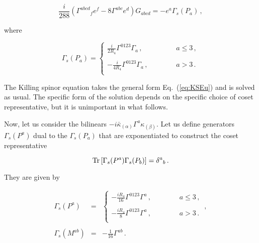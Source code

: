 \documentclass[12pt,a4paper]{article}
\begin{document}
\begin{equation}
{\textstyle\frac{i}{288}}\left(\Gamma^{abcd}{}_{f} e^{f}
-8\Gamma^{abc}e^{d} \right)G_{abcd}=
-e^{a}\Gamma_{s}(P_{a})\, ,
\end{equation}

\noindent 
where 

\begin{equation}
\Gamma_{s}(P_{a}) =
\left\{
  \begin{array}{ccc}
\frac{i}{2R_{4}}\Gamma^{0123}\Gamma_{a}\, ,& \hspace{1cm} & a\leq 3\, ,\\
& & \\
-\frac{i}{4R_{4}}\Gamma^{0123}\Gamma_{a}\, ,& \hspace{1cm} & a> 3\, .\\
  \end{array}
\right.  
\end{equation}

\noindent
The Killing spinor equation takes the general form Eq.~(\ref{eq:KSEu})
and is solved as usual. The specific form of the solution depends on
the specific choice of coset representative, but it is unimportant in
what follows.

Now, let us consider the bilinears
$-i\bar{\kappa}_{(\alpha)}\Gamma^{a}\kappa_{(\beta)}$. Let us define
generators $\Gamma_{s}(P^{a})$ dual to the $\Gamma_{s}(P_{a})$ that
are exponentiated to construct the coset representative 

\begin{equation}
{\rm Tr}\, [ \Gamma_{s}(P^{a}) \Gamma_{s}(P_{b})] = \delta^{a}{}_{b}\, .
\end{equation}

They are given by 

\begin{equation}
  \begin{array}{rcl}
\Gamma_{s}(P^{a}) & = &
\left\{
  \begin{array}{ccc}
-\frac{iR_{4}}{16}\Gamma^{0123}\Gamma^{a}\, ,& \hspace{1cm} & a\leq 3\, ,\\
& & \\
-\frac{iR_{4}}{8}\Gamma^{0123}\Gamma^{a}\, ,& \hspace{1cm} & a> 3\, .\\
  \end{array}
\right.\, ,\\
& & \\
\Gamma_{s}(M^{ab}) & = & -\frac{1}{16}\Gamma^{ab}\, .\\
\end{array}
\end{equation}
\end{document}

